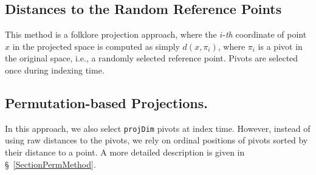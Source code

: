 \documentclass[runningheads,a4paper]{llncs}
\newcommand{\ttt}[1]{\texttt{#1}}
\begin{document}
\begin{appendix}
\subsection{Distances to the Random Reference Points} 
This method is a folklore projection approach,
where the \mbox{$i$-\textit{th}} coordinate of point $x$ in the projected space is computed as simply $d(x, \pi_i)$,
where $\pi_i$ is a pivot in the original space, i.e., a randomly selected reference point.
Pivots are selected once during indexing time.

\subsection{Permutation-based Projections.}
In this approach, we also select \ttt{projDim} pivots at index time.
However, instead of using raw distances to the pivots,
we rely on ordinal positions of pivots sorted by their distance to a point.  
A more detailed description is given in \S~\ref{SectionPermMethod}.
\end{appendix}
\end{document}
